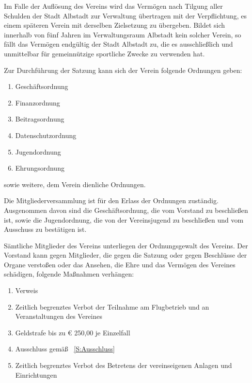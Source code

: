 \documentclass[10pt,a4paper,parskip=half]{scrartcl}
\begin{document}
\begin{contract}
    Im Falle der Auflösung des Vereins wird das Vermögen nach Tilgung aller Schulden der Stadt Albstadt zur Verwaltung übertragen mit der Verpflichtung,
    es einem späteren Verein mit derselben Zielsetzung zu übergeben.
    Bildet sich innerhalb von fünf Jahren im Verwaltungsraum Albstadt kein solcher Verein,
    so fällt das Vermögen endgültig der Stadt Albstadt zu,
    die es ausschließlich und unmittelbar für gemeinnützige sportliche Zwecke zu verwenden hat.
    
    
    Zur Durchführung der Satzung kann sich der Verein folgende Ordnungen geben:
    \begin{enumerate}[label=\alph*),noitemsep]
      \item Geschäftsordnung
      \item Finanzordnung
      \item Beitragsordnung
      \item Datenschutzordnung
      \item Jugendordnung
      \item Ehrungsordnung
    \end{enumerate}
    sowie weitere, dem Verein dienliche Ordnungen.
    
    Die Mitgliederversammlung ist für den Erlass der Ordnungen zuständig.
    Ausgenommen davon sind die Geschäftsordnung,
    die vom Vorstand zu beschließen ist,
    sowie die Jugendordnung,
    die von der Vereinsjugend zu beschließen und vom Ausschuss zu bestätigen ist.
    
    
    Sämtliche Mitglieder des Vereins unterliegen der Ordnungsgewalt des Vereins.
    Der Vorstand kann gegen Mitglieder,
    die gegen die Satzung oder gegen Beschlüsse der Organe verstoßen oder das Ansehen,
    die Ehre und das Vermögen des Vereines schädigen,
    folgende Maßnahmen verhängen:
    \begin{enumerate}[label=\alph*),noitemsep]
      \item Verweis
      \item Zeitlich begrenztes Verbot der Teilnahme am Flugbetrieb und an Veranstaltungen des Vereines
      \item Geldstrafe bis zu € 250,00 je Einzelfall
      \item Ausschluss gemäß ~\autoref{S:Ausschluss}
      \item Zeitlich begrenztes Verbot des Betretens der vereinseigenen Anlagen und Einrichtungen
    \end{enumerate}
    

\end{contract}
\end{document}
